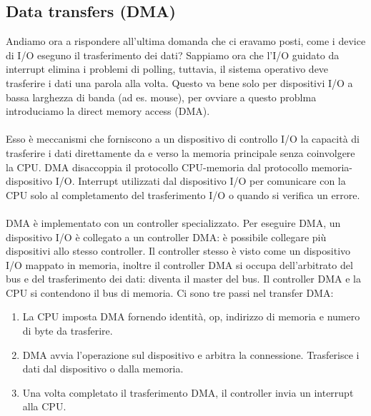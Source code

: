 \subsection{Data transfers (DMA)}
Andiamo ora a rispondere all'ultima domanda che ci eravamo posti, come i device di I/O eseguno il trasferimento dei dati?
Sappiamo ora che l'I/O guidato da interrupt elimina i problemi di polling, tuttavia, il sistema operativo deve trasferire i dati una parola alla volta. Questo va bene solo per dispositivi I/O a bassa larghezza di banda (ad es. mouse), per ovviare
a questo problma introduciamo la direct memory access (DMA).\\\\
Esso è meccanismi che forniscono a un dispositivo di controllo I/O la capacità di trasferire i dati direttamente da e verso la memoria principale senza coinvolgere la CPU. 
DMA disaccoppia il protocollo CPU-memoria dal protocollo memoria-dispositivo I/O. Interrupt utilizzati dal dispositivo I/O per comunicare con la CPU solo al completamento del trasferimento I/O o quando si verifica un errore.\\\\
DMA è implementato con un controller specializzato. Per eseguire DMA, un dispositivo I/O è collegato a un controller DMA: è possibile collegare più dispositivi allo stesso controller. Il controller stesso è visto come un dispositivo I/O mappato in memoria, 
inoltre il controller DMA si occupa dell'arbitrato del bus e del trasferimento dei dati: diventa il master del bus. Il controller DMA e la CPU si contendono il bus di memoria.
Ci sono tre passi nel transfer DMA:
\begin{enumerate}
    \item La CPU imposta DMA fornendo identità, op, indirizzo di memoria e numero di byte da trasferire.
    \item DMA avvia l'operazione sul dispositivo e arbitra la connessione. Trasferisce i dati dal dispositivo o dalla memoria.
    \item Una volta completato il trasferimento DMA, il controller invia un interrupt alla CPU.
\end{enumerate}

